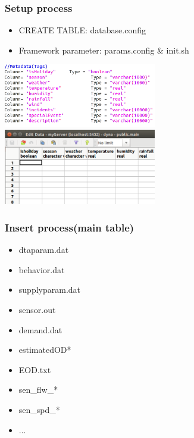\documentclass[12pt]{beamer}
\begin{document}
\begin{frame}
\frametitle{Setup process}
\begin{itemize}
\item CREATE TABLE: database.config
\item Framework parameter: params.config \& init.sh
\end{itemize}
\includegraphics[width = 0.5\textwidth]{screenshot_table.png}
\includegraphics[width = 0.5\textwidth]{screenshot_pgadmin.png}
\end{frame}



\begin{frame}
\frametitle{Insert process(main table)}
\begin{itemize}
\item dtaparam.dat
\item behavior.dat
\item supplyparam.dat
\item sensor.out
\item demand.dat
\item estimatedOD*
\item EOD.txt
\item sen\_flw\_*
\item sen\_spd\_*
\item ...
\end{itemize}
\end{frame}
\end{document}
